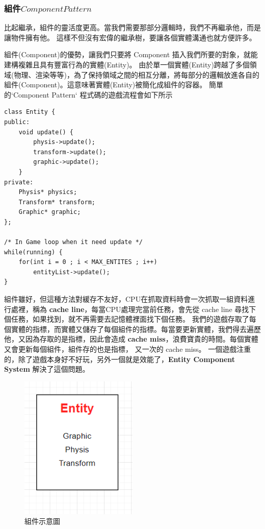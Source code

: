 \subsubsection{組件\(Component Pattern\)}

比起繼承，組件的靈活度更高。當我們需要那部分邏輯時，我們不再繼承他，而是讓物件擁有他。
這樣不但沒有宏偉的繼承樹，要讓各個實體溝通也就方便許多。

組件(Component)的優勢，讓我們只要將 Component 插入我們所要的對象，就能建構複雜且具有豐富行為的實體(Entity)。
由於單一個實體(Entity)跨越了多個領域(物理、渲染等等)，為了保持領域之間的相互分離，將每部分的邏輯放進各自的組件(Component)。這意味著實體(Entity)被簡化成組件的容器。
簡單的`Component Pattern` 程式碼的遊戲流程會如下所示

\begin{lstlisting}
class Entity {
public:
    void update() {
        physis->update();
        transform->update();
        graphic->update();
    }
private:
    Physis* physics;
    Transform* transform;
    Graphic* graphic;
};

/* In Game loop when it need update */
while(running) {
    for(int i = 0 ; i < MAX_ENTITES ; i++)
        entityList->update();
}
\end{lstlisting}

組件雖好，但這種方法對緩存不友好，CPU在抓取資料時會一次抓取一組資料進行處裡，稱為 \textbf{cache line}，每當CPU處理完當前任務，會先從 cache line 尋找下個任務，如果找到，就不再需要去記憶體裡面找下個任務。
我們的遊戲存取了每個實體的指標，而實體又儲存了每個組件的指標。每當要更新實體，我們得去遍歷他，又因為存取的是指標，因此會造成 \textbf{cache miss}，浪費寶貴的時間。每個實體又會更新每個組件，組件存的也是指標，
又一次的 cache miss。
一個遊戲注重的，除了遊戲本身好不好玩，另外一個就是效能了，\textbf{Entity Component System} 解決了這個問題。

\begin{figure}[h]
    \begin{center}
        \includegraphics[width=0.5\textwidth]{./resources/ecs/componentPattern.png}
    \end{center}
\caption{組件示意圖}
\label{fig:component}
\end{figure}

